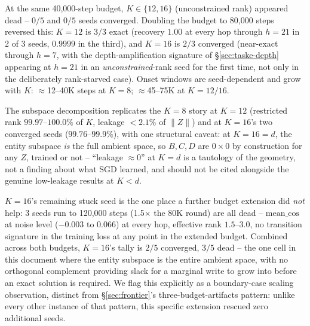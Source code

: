 At the same 40{,}000-step budget, $K\in\{12,16\}$ (unconstrained rank)
appeared dead -- $0/5$ and $0/5$ seeds converged. Doubling the budget to
80{,}000 steps reversed this: $K{=}12$ is $3/3$ exact (recovery $1.00$ at
every hop through $h{=}21$ in 2 of 3 seeds, $0.9999$ in the third), and
$K{=}16$ is $2/3$ converged (near-exact through $h{=}7$, with the
depth-amplification signature of \S\ref{sec:taske-depth} appearing at
$h{=}21$ in an \emph{unconstrained}-rank seed for the first time, not only
in the deliberately rank-starved case). Onset windows are seed-dependent
and grow with $K$: $\approx$12--40K steps at $K{=}8$;
$\approx$45--75K at $K{=}12/16$.

The subspace decomposition replicates the $K{=}8$ story at $K{=}12$
(restricted rank $99.97$--$100.0\%$ of $K$, leakage $<2.1\%$ of $\|Z\|$) and
at $K{=}16$'s two converged seeds ($99.76$--$99.9\%$), with one structural
caveat: at $K{=}16{=}d$, the entity subspace \emph{is} the full ambient
space, so $B,C,D$ are $0\times0$ by construction for any $Z$, trained or
not -- ``leakage $\approx0$'' at $K{=}d$ is a tautology of the geometry,
not a finding about what SGD learned, and should not be cited alongside the
genuine low-leakage results at $K<d$.

$K{=}16$'s remaining stuck seed is the one place a further budget extension
did \emph{not} help: 3 seeds run to 120{,}000 steps (1.5$\times$ the 80K
round) are all dead -- $\mathrm{mean\_cos}$ at noise level
($-0.003$ to $0.066$) at every hop, effective rank $1.5$--$3.0$, no
transition signature in the training loss at any point in the extended
budget. Combined across both budgets, $K{=}16$'s tally is $2/5$ converged,
$3/5$ dead -- the one cell in this document where the entity subspace is
the entire ambient space, with no orthogonal complement providing slack for
a marginal write to grow into before an exact solution is required. We
flag this explicitly as a boundary-case scaling observation, distinct from
\S\ref{sec:frontier}'s three-budget-artifacts pattern: unlike every other
instance of that pattern, this specific extension rescued zero additional
seeds.
